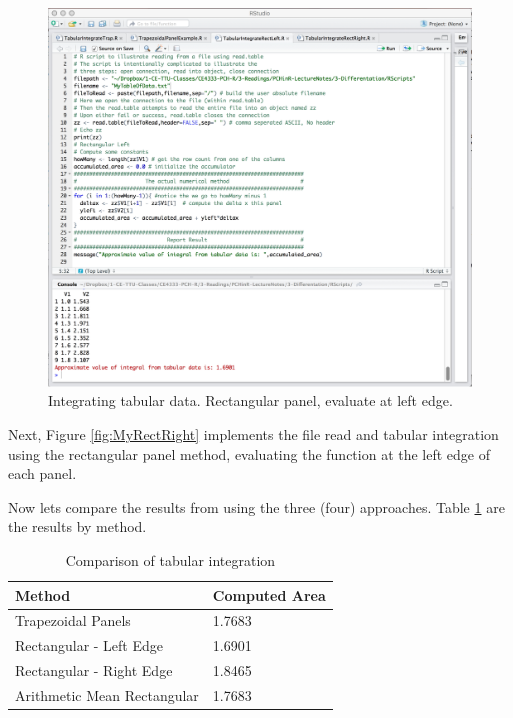 \begin{figure}[h!] %
   \centering
   \includegraphics[width=6in]{./3-Differentation/MyRectLeft.jpg} 
   \caption{Integrating tabular data.   Rectangular panel, evaluate at left edge.}
   \label{fig:MyRectLeft}
\end{figure}

Next, Figure \ref{fig:MyRectRight} implements the file read and tabular integration using the rectangular panel method, evaluating the function at the left edge of each panel.

Now lets compare the results from using the three (four) approaches.  Table \ref{tab:MyTabularMethodCompare} are the results by method.   
\begin{table}[h!]
   \centering
   \caption{Comparison of tabular integration}
   \begin{tabular}{p{2.5in}p{2in}} 
   Method & Computed Area \\
   \hline
   \hline
Trapezoidal Panels & 1.7683 \\
Rectangular - Left Edge & 1.6901 \\
Rectangular - Right Edge & 1.8465 \\
Arithmetic Mean Rectangular & 1.7683  \\
   \hline
   \end{tabular}
   \label{tab:MyTabularMethodCompare}
\end{table}


